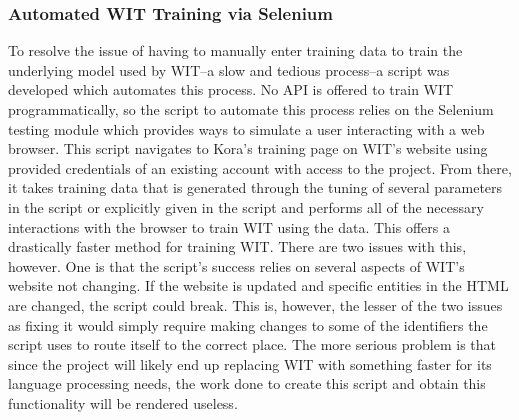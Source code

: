 \documentclass[onecolumn, draftclsnofoot,10pt, compsoc]{IEEEtran}
\begin{document}
    	\subsubsection{Automated WIT Training via Selenium}
		    To resolve the issue of having to manually enter training data to train the underlying model used by WIT--a slow and tedious process--a script was developed which automates this process.
		    No API is offered to train WIT programmatically, so the script to automate this process relies on the Selenium testing module which provides ways to simulate a user interacting with a web browser.
		    This script navigates to Kora's training page on WIT's website using provided credentials of an existing account with access to the project.
		    From there, it takes training data that is generated through the tuning of several parameters in the script or explicitly given in the script and performs all of the necessary interactions with the browser to train WIT using the data.
		    This offers a drastically faster method for training WIT.
		    There are two issues with this, however.
		    One is that the script's success relies on several aspects of WIT's website not changing.
		    If the website is updated and specific entities in the HTML are changed, the script could break.
		    This is, however, the lesser of the two issues as fixing it would simply require making changes to some of the identifiers the script uses to route itself to the correct place.
		    The more serious problem is that since the project will likely end up replacing WIT with something faster for its language processing needs, the work done to create this script and obtain this functionality will be rendered useless.

 
\end{document}

